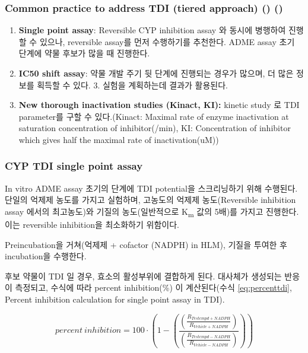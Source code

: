 \documentclass[
  11pt,
  krantz2, a4paper, twoside]{krantz}
\providecommand{\tightlist}{%
  \setlength{\itemsep}{0pt}\setlength{\parskip}{0pt}}
\begin{document}
\subsubsection{\texorpdfstring{Common practice to address TDI (tiered approach) () ()}{Common practice to address TDI (tiered approach) (Cyprotex 2023) (Grimm et al. 2009)}}\label{common-practice-to-address-tdi-tiered-approach-invitroadme-grimm2009conduct}

\begin{enumerate}
\def\labelenumi{\arabic{enumi}.}
\tightlist
\item
  \textbf{Single point assay}: Reversible CYP inhibition assay 와 동시에
  병행하여 진행할 수 있으나, reversible assay를 먼저 수행하기를
  추천한다. ADME assay 초기 단계에 약물 후보가 많을 때 진행한다.
\item
  \textbf{IC50 shift assay}: 약물 개발 주기 뒷 단계에 진행되는 경우가
  많으며, 더 많은 정보를 획득할 수 있다. 3. 실험을 계획하는데 결과가
  활용된다.
\item
  \textbf{New thorough inactivation studies (Kinact, KI):} kinetic study 로
  TDI parameter를 구할 수 있다.(Kinact: Maximal rate of enzyme
  inactivation at saturation concentration of inhibitor(/min), KI:
  Concentration of inhibitor which gives half the maximal rate of
  inactivation(uM))
\end{enumerate}

\subsubsection{CYP TDI single point assay}\label{cyp-tdi-single-point-assay}

In vitro ADME assay 초기의 단계에 TDI potential을 스크리닝하기 위해
수행된다. 단일의 억제제 농도를 가지고 실험하며, 고농도의 억제제
농도(Reversible inhibition assay 에서의 최고농도)와 기질의
농도(일반적으로 K\textsubscript{m} 값의 5배)를 가지고 진행한다. 이는 reversible
inhibition을 최소화하기 위함이다.

Preincubation을 거쳐(억제제 + cofactor (NADPH) in HLM), 기질을 투여한 후
incubation을 수행한다.

후보 약물이 TDI 일 경우, 효소의 활성부위에 결합하게 된다. 대사체가
생성되는 반응이 측정되고, 수식에 따라 percent inhibition(\%) 이
계산된다(수식 \eqref{eq:percenttdi}, Percent inhibition calculation for
single point assay in TDI).

\begin{equation}
percent\ inhibition = 100\cdot(1- (\frac{(\frac{R_{Testcmpd+NADPH}}{{R_{Vehicle+NADPH}}})}{(\frac{R_{Testcmpd-NADPH}}{{R_{Vehicle-NADPH}}})}))
\label{eq:percenttdi}
\end{equation}
\end{document}
